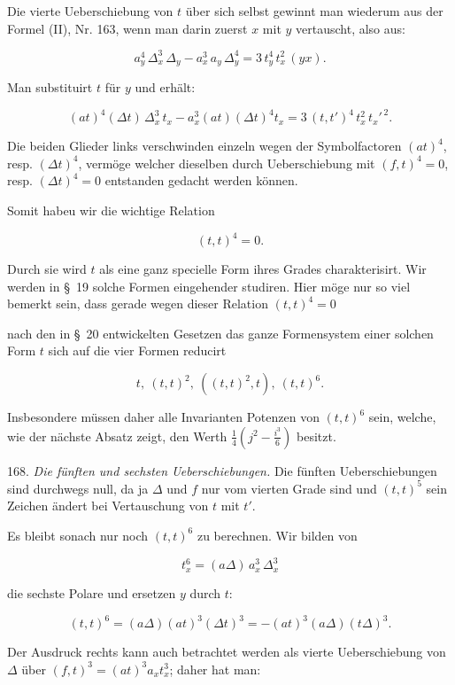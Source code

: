 \documentclass[11pt]{article}
\providecommand{\weberpage}[1]{}
\providecommand{\weq}[2]{\begin{equation}\tag{#1}#2\end{equation}}
\let\Delta\varDelta
\begin{document}
Die vierte Ueberschiebung von $t$ über sich selbst gewinnt man wiederum aus der Formel (II), Nr. 163, wenn man darin zuerst $x$ mit $y$ vertauscht, also aus:

\[
a_y^4\,\Delta_x^3\,\Delta_y - a_x^3\,a_y\,\Delta_y^4 = 3\,t_y^4\,t_x^2\,(yx).
\]

Man substituirt $t$ für $y$ und erhält:

\[
(at)^4(\Delta t)\,\Delta_x^3\,t_x - a_x^3(at)(\Delta t)^4 t_x = 3\,(t,t')^4\,t_x^2\,t_x'^{\,2}.
\]

Die beiden Glieder links verschwinden einzeln wegen der Symbolfactoren $(at)^4$, resp. $(\Delta t)^4$, vermöge welcher dieselben durch Ueberschiebung mit $(f,t)^4=0$, resp. $(\Delta t)^4=0$ entstanden gedacht werden können.

Somit habeu wir die wichtige Relation %

\weq{12}{(t,t)^4 = 0.}

Durch sie wird $t$ als eine ganz specielle Form ihres Grades charakterisirt. Wir werden in \S~19 solche Formen eingehender studiren. Hier möge nur so viel bemerkt sein, dass gerade wegen dieser Relation $(t,t)^4=0$


\weberpage{186}

nach den in \S~20 entwickelten Gesetzen das ganze Formensystem einer solchen Form $t$ sich auf die vier Formen reducirt

\[
t,\ (t,t)^2,\ ((t,t)^2,t),\ (t,t)^6.
\]

Insbesondere müssen daher alle Invarianten Potenzen von $(t,t)^6$ sein, welche, wie der nächste Absatz zeigt, den Werth $\frac{1}{4}\left(j^2-\frac{i^3}{6}\right)$ besitzt.

168. \textit{Die fünften und sechsten Ueberschiebungen.} Die fünften Ueberschiebungen sind durchwegs null, da ja $\Delta$ und $f$ nur vom vierten Grade sind und $(t,t)^5$ sein Zeichen ändert bei Vertauschung von $t$ mit $t'$.

Es bleibt sonach nur noch $(t,t)^6$ zu berechnen. Wir bilden von

\[
t_x^6 = (a\Delta)\,a_x^3\,\Delta_x^3
\]

die sechste Polare und ersetzen $y$ durch $t$:

\[
(t,t)^6 = (a\Delta)(at)^3(\Delta t)^3 = -(at)^3(a\Delta)(t\Delta)^3.
\]

Der Ausdruck rechts kann auch betrachtet werden als vierte Ueberschiebung von $\Delta$ über $(f,t)^3=(at)^3a_x t_x^3$; daher hat man:
\end{document}

